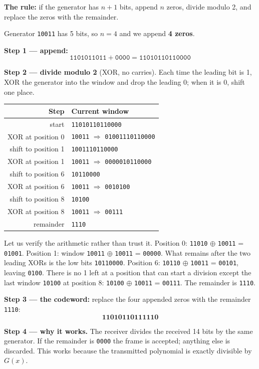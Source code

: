 \documentclass[11pt,a4paper]{article}
\begin{document}
\begin{solbox}
\textbf{The rule:} if the generator has $n+1$ bits, append $n$ zeros, divide modulo 2, and replace the zeros with the remainder.

Generator \texttt{10011} has 5 bits, so $n = 4$ and we append \textbf{4 zeros}.

\textbf{Step 1 --- append:}
\[
\texttt{1101011011} + \texttt{0000} = \texttt{11010110110000}
\]

\textbf{Step 2 --- divide modulo 2} (XOR, no carries). Each time the leading bit is 1, XOR the generator into the window and drop the leading 0; when it is 0, shift one place.

\begin{center}\small
\begin{tabular}{r|l}
\toprule Step & Current window\\
\midrule
start & \texttt{11010110110000}\\
XOR at position 0 & \texttt{10011} $\Rightarrow$ \texttt{01001110110000}\\
shift to position 1 & \texttt{1001110110000}\\
XOR at position 1 & \texttt{10011} $\Rightarrow$ \texttt{0000010110000}\\
shift to position 6 & \texttt{10110000}\\
XOR at position 6 & \texttt{10011} $\Rightarrow$ \texttt{0010100}\\
shift to position 8 & \texttt{10100}\\
XOR at position 8 & \texttt{10011} $\Rightarrow$ \texttt{00111}\\
remainder & \texttt{1110}\\
\bottomrule
\end{tabular}
\end{center}

Let us verify the arithmetic rather than trust it. Position 0: \texttt{11010} $\oplus$ \texttt{10011} = \texttt{01001}. Position 1: window \texttt{10011} $\oplus$ \texttt{10011} = \texttt{00000}. What remains after the two leading XORs is the low bits \texttt{10110000}. Position 6: \texttt{10110} $\oplus$ \texttt{10011} = \texttt{00101}, leaving \texttt{0100}. There is no 1 left at a position that can start a division except the last window \texttt{10100} at position 8: \texttt{10100} $\oplus$ \texttt{10011} = \texttt{00111}. The remainder is \texttt{1110}.

\textbf{Step 3 --- the codeword:} replace the four appended zeros with the remainder \texttt{1110}:
\[
\textbf{11010110111110}
\]

\textbf{Step 4 --- why it works.} The receiver divides the received 14 bits by the same generator. If the remainder is \texttt{0000} the frame is accepted; anything else is discarded. This works because the transmitted polynomial is exactly divisible by $G(x)$.
\end{solbox}
\end{document}
